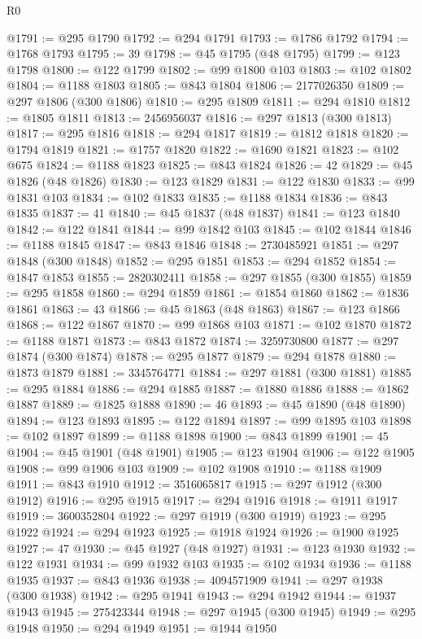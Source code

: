 \begin{lexlean}{R0}
\begin{coremodule}
@1791 := @295 @1790
@1792 := @294 @1791
@1793 := @1786 @1792
@1794 := @1768 @1793
@1795 := 39
@1798 := @45 @1795 (@48 @1795)
@1799 := @123 @1798
@1800 := @122 @1799
@1802 := @99 @1800 @103
@1803 := @102 @1802
@1804 := @1188 @1803
@1805 := @843 @1804
@1806 := 2177026350
@1809 := @297 @1806 (@300 @1806)
@1810 := @295 @1809
@1811 := @294 @1810
@1812 := @1805 @1811
@1813 := 2456956037
@1816 := @297 @1813 (@300 @1813)
@1817 := @295 @1816
@1818 := @294 @1817
@1819 := @1812 @1818
@1820 := @1794 @1819
@1821 := @1757 @1820
@1822 := @1690 @1821
@1823 := @102 @675
@1824 := @1188 @1823
@1825 := @843 @1824
@1826 := 42
@1829 := @45 @1826 (@48 @1826)
@1830 := @123 @1829
@1831 := @122 @1830
@1833 := @99 @1831 @103
@1834 := @102 @1833
@1835 := @1188 @1834
@1836 := @843 @1835
@1837 := 41
@1840 := @45 @1837 (@48 @1837)
@1841 := @123 @1840
@1842 := @122 @1841
@1844 := @99 @1842 @103
@1845 := @102 @1844
@1846 := @1188 @1845
@1847 := @843 @1846
@1848 := 2730485921
@1851 := @297 @1848 (@300 @1848)
@1852 := @295 @1851
@1853 := @294 @1852
@1854 := @1847 @1853
@1855 := 2820302411
@1858 := @297 @1855 (@300 @1855)
@1859 := @295 @1858
@1860 := @294 @1859
@1861 := @1854 @1860
@1862 := @1836 @1861
@1863 := 43
@1866 := @45 @1863 (@48 @1863)
@1867 := @123 @1866
@1868 := @122 @1867
@1870 := @99 @1868 @103
@1871 := @102 @1870
@1872 := @1188 @1871
@1873 := @843 @1872
@1874 := 3259730800
@1877 := @297 @1874 (@300 @1874)
@1878 := @295 @1877
@1879 := @294 @1878
@1880 := @1873 @1879
@1881 := 3345764771
@1884 := @297 @1881 (@300 @1881)
@1885 := @295 @1884
@1886 := @294 @1885
@1887 := @1880 @1886
@1888 := @1862 @1887
@1889 := @1825 @1888
@1890 := 46
@1893 := @45 @1890 (@48 @1890)
@1894 := @123 @1893
@1895 := @122 @1894
@1897 := @99 @1895 @103
@1898 := @102 @1897
@1899 := @1188 @1898
@1900 := @843 @1899
@1901 := 45
@1904 := @45 @1901 (@48 @1901)
@1905 := @123 @1904
@1906 := @122 @1905
@1908 := @99 @1906 @103
@1909 := @102 @1908
@1910 := @1188 @1909
@1911 := @843 @1910
@1912 := 3516065817
@1915 := @297 @1912 (@300 @1912)
@1916 := @295 @1915
@1917 := @294 @1916
@1918 := @1911 @1917
@1919 := 3600352804
@1922 := @297 @1919 (@300 @1919)
@1923 := @295 @1922
@1924 := @294 @1923
@1925 := @1918 @1924
@1926 := @1900 @1925
@1927 := 47
@1930 := @45 @1927 (@48 @1927)
@1931 := @123 @1930
@1932 := @122 @1931
@1934 := @99 @1932 @103
@1935 := @102 @1934
@1936 := @1188 @1935
@1937 := @843 @1936
@1938 := 4094571909
@1941 := @297 @1938 (@300 @1938)
@1942 := @295 @1941
@1943 := @294 @1942
@1944 := @1937 @1943
@1945 := 275423344
@1948 := @297 @1945 (@300 @1945)
@1949 := @295 @1948
@1950 := @294 @1949
@1951 := @1944 @1950

\end{coremodule}
\end{lexlean}
